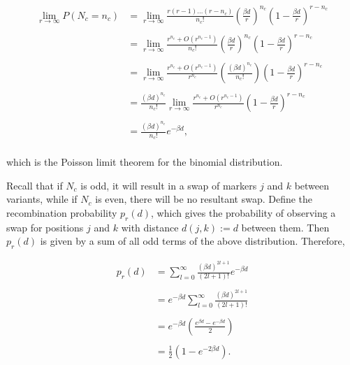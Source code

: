\documentclass{article}
\begin{document}
\begin{equation} \label{eq:poissonlim}
  \begin{split}
    \lim_{r \rightarrow \infty} P(N_c = n_c) & = \lim_{r \rightarrow \infty} \frac{r(r-1)\dots (r-n_c)}{n_c!} \left ( \frac{\beta d}{r} \right )^{n_c} \left ( 1-\frac{\beta d}{r} \right )^{r - n_c} \\
    & \\
    & = \lim_{r \rightarrow \infty} \frac{r^{n_c} + O(r^{n_c-1})}{n_c!} \left ( \frac{\beta d}{r} \right )^{n_c} \left ( 1-\frac{\beta d}{r} \right )^{r - n_c} \\
    & \\
    & = \lim_{r \rightarrow \infty} \frac{r^{n_c} + O(r^{n_c-1})}{r^{n_c}} \left ( \frac{(\beta d)^{n_c}}{n_c!} \right ) \left ( 1-\frac{\beta d}{r} \right )^{r - n_c} \\
    & \\
    & = \frac{(\beta d)^{n_c}}{n_c!} \lim_{r \rightarrow \infty} \frac{r^{n_c} + O(r^{n_c-1})}{r^{n_c}} \left ( 1-\frac{\beta d}{r} \right )^{r - n_c} \\
    & \\
    & = \frac{(\beta d)^{n_c}}{n_c!} e^{-\beta d}, \\
  \end{split}
\end{equation}

\noindent which is the Poisson limit theorem for the binomial distribution.

Recall that if $N_c$ is odd, it will result in a swap of markers $j$ and $k$ between variants, while if $N_c$ is even, there will be no resultant swap. Define the recombination probability $p_r(d)$, which gives the probability of observing a swap for positions $j$ and $k$ with distance $d(j,k) := d$ between them. Then $p_r(d)$ is given by a sum of all odd terms of the above distribution. Therefore,

\begin{equation} \label{eq:haldanemap}
  \begin{split}
    p_r(d) & = \sum_{l = 0}^{\infty} \frac{(\beta d)^{2l + 1}}{(2l + 1)!} e^{-\beta d} \\
    & \\
    & = e^{-\beta d} \sum_{l = 0}^{\infty} \frac{(\beta d)^{2l + 1}}{(2l + 1)!} \\
    & \\
    & = e^{-\beta d} \left ( \frac{e^{\beta d} - e^{- \beta d}}{2} \right ) \\
    & \\
    & = \frac{1}{2} \left ( 1 - e^{-2 \beta d} \right ) .\\
  \end{split}
\end{equation}
\end{document}
